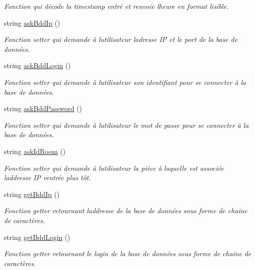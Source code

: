 \begin{DoxyCompactItemize}
\begin{DoxyCompactList}\small\item\em Fonction qui décode la timestamp entré et renvoie l\textquotesingle{}heure en format lisible. \end{DoxyCompactList}\item 
string \hyperlink{classEchoClient_a2f6bc3131e02cbbcf3d422b08ec88185}{ask\+Bdd\+Ip} ()
\begin{DoxyCompactList}\small\item\em Fonction setter qui demande à l\textquotesingle{}utilisateur l\textquotesingle{}adresse IP et le port de la base de données. \end{DoxyCompactList}\item 
string \hyperlink{classEchoClient_ad6b9cddeae9043d79bf482da303c4b21}{ask\+Bdd\+Login} ()
\begin{DoxyCompactList}\small\item\em Fonction setter qui demande à l\textquotesingle{}utilisateur son identifiant pour se connecter à la base de données. \end{DoxyCompactList}\item 
string \hyperlink{classEchoClient_a7c8ccafa27fff1427fedae3fa8327e6e}{ask\+Bdd\+Password} ()
\begin{DoxyCompactList}\small\item\em Fonction setter qui demande à l\textquotesingle{}utilisateur le mot de passe pour se connecter à la base de données. \end{DoxyCompactList}\item 
string \hyperlink{classEchoClient_a80d1d6acbdc39d74740bf0e66c6e4c27}{ask\+Id\+Room} ()
\begin{DoxyCompactList}\small\item\em Fonction setter qui demande à l\textquotesingle{}utilisateur la pièce à laquelle est associée l\textquotesingle{}addresse IP rentrée plus tôt. \end{DoxyCompactList}\item 
string \hyperlink{classEchoClient_a3f7731443eebfdb9dc3484aa9f44d0db}{get\+Bdd\+Ip} ()
\begin{DoxyCompactList}\small\item\em Fonction getter retournant l\textquotesingle{}addresse de la base de données sous forme de chaine de caractères. \end{DoxyCompactList}\item 
string \hyperlink{classEchoClient_a4e8b1f06f6149d913b87786d0b926c2b}{get\+Bdd\+Login} ()
\begin{DoxyCompactList}\small\item\em Fonction getter retournant le login de la base de données sous forme de chaine de caractères. \end{DoxyCompactList}\item 

\end{DoxyCompactItemize}
